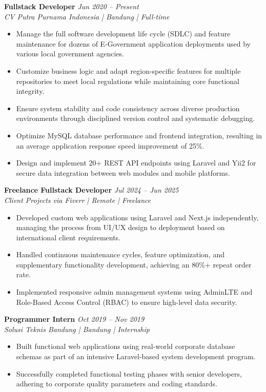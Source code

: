 \documentclass[11pt,a4paper]{article}
\begin{document}
\textbf{Fullstack Developer} \hfill \textit{Jun 2020 -- Present} \\
\textit{CV Putra Purnama Indonesia | Bandung | Full-time}
\begin{itemize}
    \item Manage the full software development life cycle (SDLC) and feature maintenance for dozens of E-Government application deployments used by various local government agencies.
    \item Customize business logic and adapt region-specific features for multiple repositories to meet local regulations while maintaining core functional integrity.
    \item Ensure system stability and code consistency across diverse production environments through disciplined version control and systematic debugging.
    \item Optimize MySQL database performance and frontend integration, resulting in an average application response speed improvement of 25\%.
    \item Design and implement 20+ REST API endpoints using Laravel and Yii2 for secure data integration between web modules and mobile platforms.
\end{itemize}

\textbf{Freelance Fullstack Developer} \hfill \textit{Jul 2024 -- Jun 2025} \\
\textit{Client Projects via Fiverr | Remote | Freelance}
\begin{itemize}
    \item Developed custom web applications using Laravel and Next.js independently, managing the process from UI/UX design to deployment based on international client requirements.
    \item Handled continuous maintenance cycles, feature optimization, and supplementary functionality development, achieving an 80\%+ repeat order rate.
    \item Implemented responsive admin management systems using AdminLTE and Role-Based Access Control (RBAC) to ensure high-level data security.
\end{itemize}

\textbf{Programmer Intern} \hfill \textit{Oct 2019 -- Nov 2019} \\
\textit{Solusi Teknis Bandung | Bandung | Internship}
\begin{itemize}
    \item Built functional web applications using real-world corporate database schemas as part of an intensive Laravel-based system development program.
    \item Successfully completed functional testing phases with senior developers, adhering to corporate quality parameters and coding standards.
\end{itemize}
\end{document}
